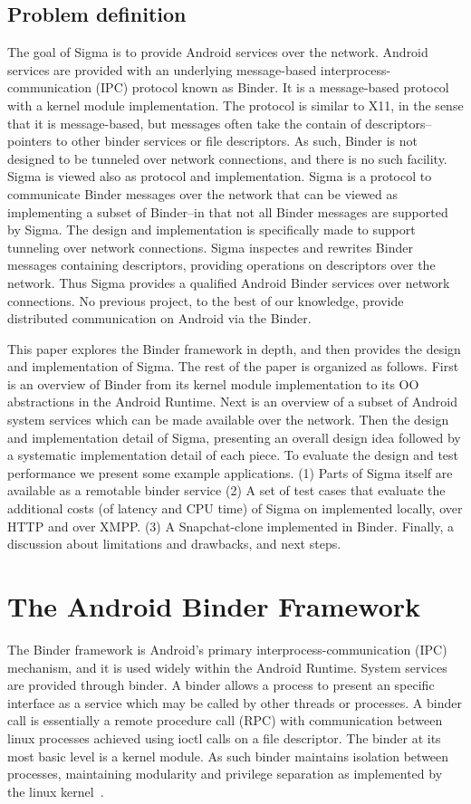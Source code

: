 \documentclass[prodmode]{acmlarge}
\begin{document}
\subsection{Problem definition}

The goal of Sigma is to provide Android services over the network. Android services are provided with an underlying message-based interprocess-communication (IPC) protocol known as Binder. It is a message-based protocol with a kernel module implementation. The protocol is similar to X11, in the sense that it is message-based, but messages often take the contain of descriptors--pointers to other binder services or file descriptors. As such, Binder is not designed to be tunneled over network connections, and there is no such facility. Sigma is viewed also as protocol and implementation. Sigma is a protocol to communicate Binder messages over the network that can be viewed as implementing a subset of Binder--in that not all Binder messages are supported by Sigma. The design and implementation is specifically made to support tunneling over network connections. Sigma inspectes and rewrites Binder messages containing descriptors, providing operations on descriptors over the network. Thus Sigma provides a qualified Android Binder services over network connections. No previous project, to the best of our knowledge, provide distributed communication on Android via the Binder.

This paper explores the Binder framework in depth, and then provides the design and implementation of Sigma. The rest of the paper is organized as follows. First is an overview of Binder from its kernel module implementation to its OO abstractions in the Android Runtime. Next is an overview of a subset of Android system services which can be made available over the network. Then the design and implementation detail of Sigma, presenting an overall design idea followed by a systematic implementation detail of each piece. To evaluate the design and test performance we present some example applications. (1) Parts of Sigma itself are available as a remotable binder service (2) A set of test cases that evaluate the additional costs (of latency and CPU time) of Sigma on implemented locally, over HTTP and over XMPP. (3) A Snapchat-clone implemented in Binder. Finally, a discussion about limitations and drawbacks, and next steps.

\section{The Android Binder Framework}
The Binder framework is Android's primary interprocess-communication (IPC) mechanism, and it is used widely within the Android Runtime. System services are provided through binder.
A binder allows a process to present an specific interface as a service which may be called by other threads or processes. A binder call is essentially a remote procedure call (RPC) with communication between linux processes achieved using ioctl calls on a file descriptor. The binder at its most basic level is a kernel module. As such binder maintains isolation between processes, maintaining modularity and privilege separation as implemented by the linux kernel~\cite{OpenBinder}.
\end{document}
